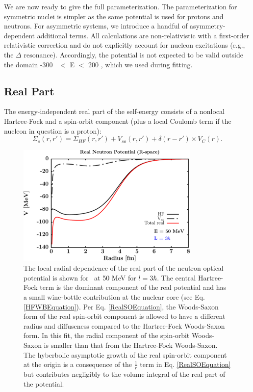 We are now ready to give the full parameterization. The parameterization for symmetric nuclei
is simpler as the same potential is used for protons and neutrons. For asymmetric systems, we
introduce a handful of asymmetry-dependent additional terms.
All calculations are non-relativistic
with a first-order relativistic correction and do not explicitly account for
nucleon excitations (e.g., the $\Delta$ resonance). Accordingly, the potential
is not expected to be valid outside
the domain -300 \mega\electronvolt\ $<$ E $<$ 200 \mega\electronvolt,
which we used during fitting.

\subsection{Real Part}
The energy-independent real part of the self-energy consists of a nonlocal Hartree-Fock and
a spin-orbit component (plus a local Coulomb term if the nucleon in question is a proton):
\begin{equation}
    \Sigma_{s}(r,r') =
    \Sigma_{HF}(r,r')+V_{so}(r,r')+\delta(r-r')\times V_{C}(r).
\end{equation}
\begin{figure}[tb]
    \centering
    \includegraphics[width=0.8\textwidth]{figures/RealPotentialRSpace.png}
    \caption[Radial dependence of the real part of the potential]
    {
        The local radial dependence of the real part of the neutron optical potential is shown
        for \niEight\ at 50 MeV for $l=3\hbar$. The central Hartree-Fock term
        is the dominant component of the real potential and has a small
        wine-bottle contribution at the nuclear core (see Eq.
        \ref{HFWBEquation}). Per Eq. \ref{RealSOEquation}, the Woods-Saxon form
        of the real spin-orbit component is allowed to have a different radius
        and diffuseness compared to the Hartree-Fock Woods-Saxon form. In this
        fit, the radial component of the spin-orbit Woods-Saxon is smaller than
        that from the Hartree-Fock Woods-Saxon. The
        hyberbolic asymptotic growth of the real spin-orbit component at the
        origin is a consequence of the $\frac{1}{r}$ term in Eq. \ref{RealSOEquation}
        but contributes negligibly to the volume integral of the real part of the potential.
    }
    \label{RealRadialDependence}
\end{figure}
